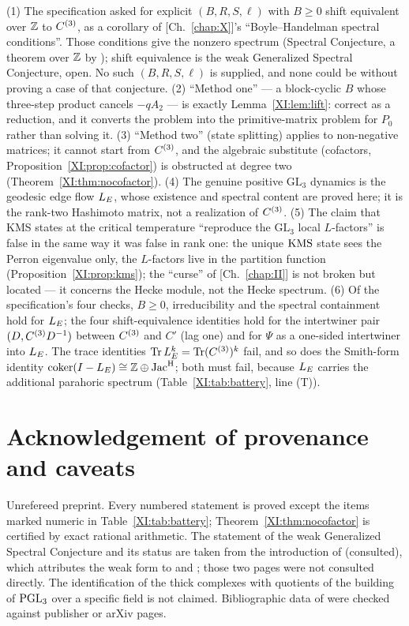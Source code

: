 \begin{remark}\label{XI:rem:corrections}
\begin{sloppypar}
(1) The specification asked for explicit $(B,R,S,\ell)$ with $B\ge0$ shift equivalent over
$\mathbb{Z}$ to $C^{(3)}$, as a corollary of [Ch.~\ref{chap:X}]'s ``Boyle--Handelman spectral conditions''. Those conditions give the nonzero spectrum
(Spectral Conjecture, a theorem over $\mathbb{Z}$ by \cite{KOR}); shift equivalence is the weak
Generalized Spectral Conjecture, open. No such $(B,R,S,\ell)$ is supplied, and none could
be without proving a case of that conjecture. (2) ``Method one'' --- a block-cyclic $B$
whose three-step product cancels $-qA_2$ --- is exactly Lemma~\ref{XI:lem:lift}: correct as a
reduction, and it converts the problem into the primitive-matrix problem for $P_0$ rather
than solving it. (3) ``Method two'' (state splitting) applies to non-negative matrices; it
cannot start from $C^{(3)}$, and the algebraic substitute (cofactors,
Proposition~\ref{XI:prop:cofactor}) is obstructed at degree two (Theorem~\ref{XI:thm:nocofactor}).
(4) The genuine positive $\mathrm{GL}_3$ dynamics is the geodesic edge flow $L_E$, whose
existence and spectral content are proved here; it is the rank-two Hashimoto matrix, not a
realization of $C^{(3)}$. (5) The claim that KMS states at the critical temperature
``reproduce the $\mathrm{GL}_3$ local $L$-factors'' is false in the same way it was false in
rank one: the unique $\mathrm{KMS}$ state sees the Perron eigenvalue only, the $L$-factors live in
the partition function (Proposition~\ref{XI:prop:kms}); the ``curse'' of [Ch.~\ref{chap:II}] is not broken but
located --- it concerns the Hecke module, not the Hecke spectrum. (6) Of the specification's
four checks, $B\ge0$, irreducibility and the spectral containment hold for $L_E$; the four
shift-equivalence identities hold for the intertwiner pair $(D,C^{(3)} D^{-1})$ between
$C^{(3)}$ and $C'$ (lag one) and for $\Psi$ as a one-sided intertwiner into $L_E$. The trace
identities $\operatorname{Tr}L_E^{k}=\operatorname{Tr}(C^{(3)})^{k}$ fail, and so does the Smith-form identity
$\operatorname{coker}(I-L_E)\cong\mathbb{Z}\oplus\operatorname{Jac}^{\mathrm{H}}$; both must fail, because $L_E$ carries the additional
parahoric spectrum (Table~\ref{XI:tab:battery}, line (T)).
\end{sloppypar}
\end{remark}

\section*{Acknowledgement of provenance and caveats}

Unrefereed preprint. Every numbered statement is proved except the items marked numeric in
Table~\ref{XI:tab:battery}; Theorem~\ref{XI:thm:nocofactor} is certified by exact rational
arithmetic. The statement of the weak Generalized Spectral Conjecture and its status are
taken from the introduction of \cite{BS} (consulted), which attributes the weak form to
\cite[p.~253]{BH91} and \cite[p.~124]{BH93}; those two pages were not consulted directly.
The identification of the thick complexes with quotients of the building of $\mathrm{PGL}_3$ over a
specific field is not claimed. Bibliographic data of \cite{BH91,BH93,BS,KOR,KL} were checked
against publisher or arXiv pages.

